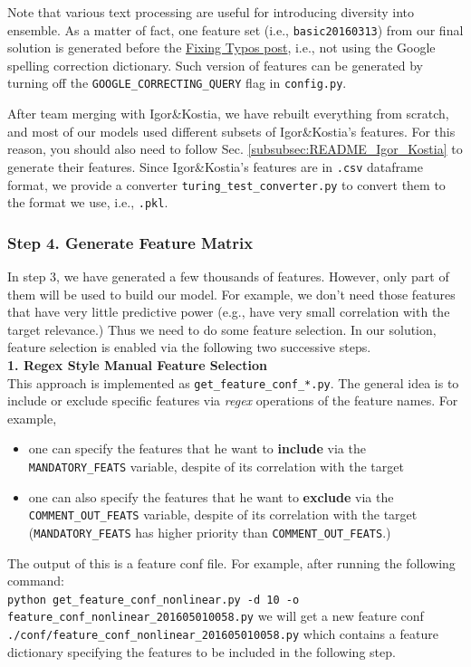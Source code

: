 \documentclass[12pt]{article}
\begin{document}
\begin{appendices}
Note that various text processing are useful for introducing diversity into ensemble. As a matter of fact, one feature set (i.e., \texttt{basic20160313}) from our final solution is generated before the \href{https://www.kaggle.com/steubk/home-depot-product-search-relevance/fixing-typos}{Fixing Typos post}, i.e., not using the Google spelling correction dictionary. Such version of features can be generated by turning off the \texttt{GOOGLE\_CORRECTING\_QUERY} flag in \texttt{config.py}.

After team merging with Igor\&Kostia, we have rebuilt everything from scratch, and most of our models used different subsets of Igor\&Kostia's features. For this reason, you should also need to follow Sec. \ref{subsubsec:README_Igor_Kostia} to generate their features. Since Igor\&Kostia's features are in \texttt{.csv} dataframe format, we provide a converter \texttt{turing\_test\_converter.py} to convert them to the format we use, i.e., \texttt{.pkl}.

\subsubsection{Step 4. Generate Feature Matrix}
In step 3, we have generated a few thousands of features. However, only part of them will be used to build our model. For example, we don't need those features that have very little predictive power (e.g., have very small correlation with the target relevance.) Thus we need to do some feature selection. In our solution, feature selection is enabled via the following two successive steps.\\
\textbf{1. Regex Style Manual Feature Selection}\\
This approach is implemented as \texttt{get\_feature\_conf\_*.py}. The general idea is to include or exclude specific features via \textit{regex} operations of the feature names. For example,
\begin{itemize}
\item one can specify the features that he want to \textbf{include} via the \texttt{MANDATORY\_FEATS} variable, despite of its correlation with the target
\item one can also specify the features that he want to \textbf{exclude} via the \texttt{COMMENT\_OUT\_FEATS} variable, despite of its correlation with the target (\texttt{MANDATORY\_FEATS} has higher priority than \texttt{COMMENT\_OUT\_FEATS}.)
\end{itemize}
The output of this is a feature conf file. For example, after running the following command:\\
\texttt{python get\_feature\_conf\_nonlinear.py -d 10 -o feature\_conf\_nonlinear\_201605010058.py}
we will get a new feature conf \texttt{./conf/feature\_conf\_nonlinear\_201605010058.py} which contains a feature dictionary specifying the features to be included in the following step.


\end{appendices}
\end{document}

